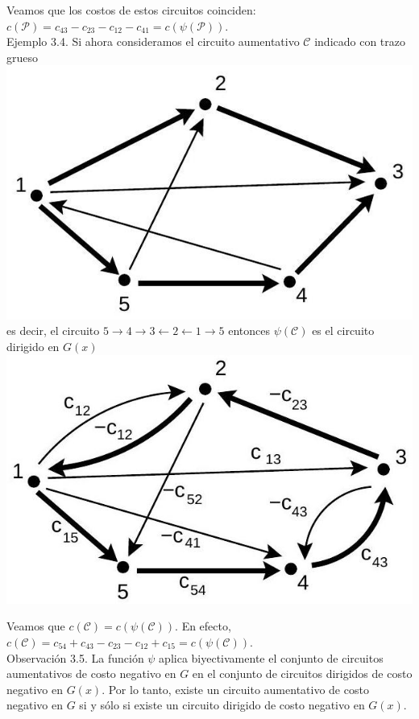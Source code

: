 \documentclass[10pt]{article}
\begin{document}
Veamos que los costos de estos circuitos coinciden: $c(\mathcal{P})=c_{43}-c_{23}-c_{12}-c_{41}=c(\psi(\mathcal{P}))$.\\
Ejemplo 3.4. Si ahora consideramos el circuito aumentativo $\mathcal{C}$ indicado con trazo grueso\\
\includegraphics[max width=\textwidth, center]{2025_09_05_955b52bfc43174a24a9ag-13(1)}\\
es decir, el circuito $5 \longrightarrow 4 \longrightarrow 3 \longleftarrow 2 \longleftarrow 1 \longrightarrow 5$ entonces $\psi(\mathcal{C})$ es el circuito dirigido en $G(x)$\\
\includegraphics[max width=\textwidth, center]{2025_09_05_955b52bfc43174a24a9ag-14}

Veamos que $c(\mathcal{C})=c(\psi(\mathcal{C}))$. En efecto, $c(\mathcal{C})=c_{54}+c_{43}-c_{23}-c_{12}+c_{15}=c(\psi(\mathcal{C}))$.\\
Observación 3.5. La función $\psi$ aplica biyectivamente el conjunto de circuitos aumentativos de costo negativo en $G$ en el conjunto de circuitos dirigidos de costo negativo en $G(x)$. Por lo tanto, existe un circuito aumentativo de costo negativo en $G$ si y sólo si existe un circuito dirigido de costo negativo en $G(x)$.
\end{document}
